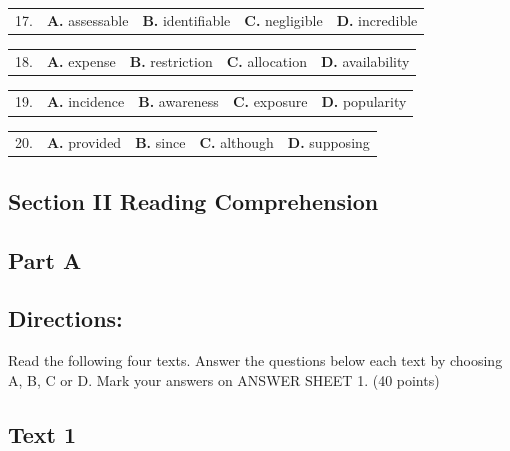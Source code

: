 \documentclass[UTF8,11pt]{ctexart}
\begin{document}
\noindent\begin{tabularx}{\linewidth}{@{}lXXXX@{}}17. & \textbf{A.} assessable & \textbf{B.} identifiable & \textbf{C.} negligible & \textbf{D.} incredible\\\end{tabularx}\par

\noindent\begin{tabularx}{\linewidth}{@{}lXXXX@{}}18. & \textbf{A.} expense & \textbf{B.} restriction & \textbf{C.} allocation & \textbf{D.} availability\\\end{tabularx}\par

\noindent\begin{tabularx}{\linewidth}{@{}lXXXX@{}}19. & \textbf{A.} incidence & \textbf{B.} awareness & \textbf{C.} exposure & \textbf{D.} popularity\\\end{tabularx}\par

\noindent\begin{tabularx}{\linewidth}{@{}lXXXX@{}}20. & \textbf{A.} provided & \textbf{B.} since & \textbf{C.} although & \textbf{D.} supposing\\\end{tabularx}\par

\subsection*{\textbf{Section II Reading Comprehension}}


\subsection*{\textbf{Part A}}


\subsection*{\textbf{Directions:}}


Read the following four texts. Answer the questions below each text by choosing A, B, C or D. Mark your answers on ANSWER SHEET 1. (40 points)


\subsection*{\textbf{Text 1}}
\end{document}
